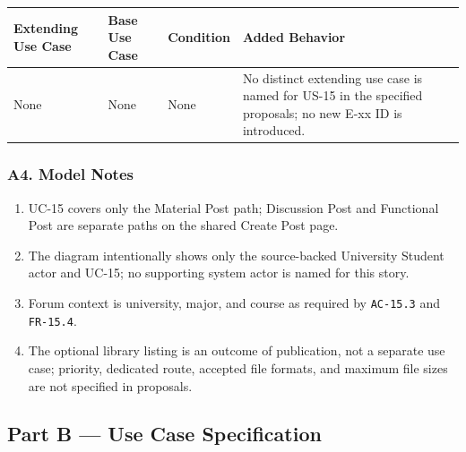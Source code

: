 \documentclass[12pt]{article}
\renewcommand{\baselinestretch}{1.5}
\begin{document}
\begingroup
\small
\renewcommand{\baselinestretch}{1.0}\selectfont
\renewcommand{\arraystretch}{1.15}
\setlength{\tabcolsep}{6pt}
\begin{longtable}{|>{\raggedright\arraybackslash}p{}|>{\raggedright\arraybackslash}p{}|>{\raggedright\arraybackslash}p{}|>{\raggedright\arraybackslash}p{}|}
\hline
\textbf{Extending Use Case} & \textbf{Base Use Case} & \textbf{Condition} & \textbf{Added Behavior} \\ \hline
\endhead
None & None & None & No distinct extending use case is named for US-15 in the specified proposals; no new E-xx ID is introduced. \\ \hline
\end{longtable}
\endgroup
\par\medskip

\hypertarget{sec:a4-model-notes}{}
\subsubsection*{A4. Model Notes}
\par\medskip

\begin{enumerate}
\item UC-15 covers only the Material Post path; Discussion Post and Functional Post are separate paths on the shared Create Post page.
\item The diagram intentionally shows only the source-backed University Student actor and UC-15; no supporting system actor is named for this story.
\item Forum context is university, major, and course as required by \texttt{AC-15.3} and \texttt{FR-15.4}.
\item The optional library listing is an outcome of publication, not a separate use case; priority, dedicated route, accepted file formats, and maximum file sizes are not specified in proposals.
\end{enumerate}
\par\medskip

\hypertarget{sec:part-b-use-case-specification}{}
\subsection*{Part B --- Use Case Specification}
\par\medskip
\end{document}
